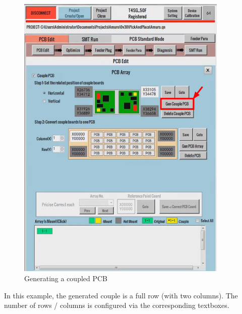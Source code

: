 \documentclass[a4paper,10pt]{report}
\begin{document}
\begin{figure}[!htb]
 \centering
 \includegraphics[width=0.9\textwidth]{images/scrot9.png}
 \caption{Generating a coupled PCB}
\end{figure}

\newpage
In this example, the generated couple is a full row (with two columns). The number of rows / columns is configured via the corresponding textboxes.\\
\end{document}
